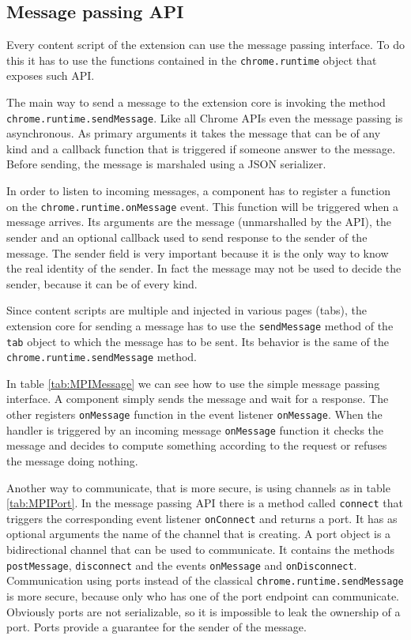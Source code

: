 \subsection{Message passing API}
\label{subs:MPI}
Every content script of the extension can use the message passing interface. To do this it has to use the functions contained in the \texttt{chrome.runtime} object \cite{ChromeExtensionRuntime} that exposes such API.

The main way to send a message to the extension core is invoking the method \texttt{chrome.runtime.sendMessage}. Like all Chrome APIs even the message passing is asynchronous. As primary arguments it takes the message that can be of any kind and a callback function that is triggered if someone answer to the message. Before sending, the message is marshaled using a JSON serializer.

In order to listen to incoming messages, a component has to register a function on the \texttt{chrome.runtime.onMessage} event. This function will be triggered when a message arrives. Its arguments are the message (unmarshalled by the API), the sender and an optional callback used to send response to the sender of the message. The sender field is very important because it is the only way to know the real identity of the sender. In fact the message may not be used to decide the sender, because it can be of every kind.

Since content scripts are multiple and injected in various pages (tabs), the extension core for sending a message has to use the \texttt{sendMessage} method of the \texttt{tab} object to which the message has to be sent. Its behavior is the same of the \texttt{chrome.runtime.sendMessage} method.

In table \ref{tab:MPIMessage} we can see how to use the simple message passing interface. A component simply sends the message and wait for a response. The other registers \texttt{onMessage} function in the event listener \texttt{onMessage}. When the handler is triggered by an incoming message \texttt{onMessage} function it checks the message and decides to compute something according to the request or refuses the message doing nothing.

Another way to communicate, that is more secure, is using channels as in table \ref{tab:MPIPort}. In the message passing API there is a method called \texttt{connect} that triggers the corresponding event listener \texttt{onConnect} and returns a port. It has as optional arguments the name of the channel that is creating. A port object is a bidirectional channel that can be used to communicate. It contains the methods \texttt{postMessage}, \texttt{disconnect} and the events \texttt{onMessage} and \texttt{onDisconnect}. Communication using ports instead of the classical \texttt{chrome.runtime.sendMessage} is more secure, because only who has one of the port endpoint can communicate. Obviously ports are not serializable, so it is impossible to leak the ownership of a port. Ports provide a guarantee for the sender of the message.

